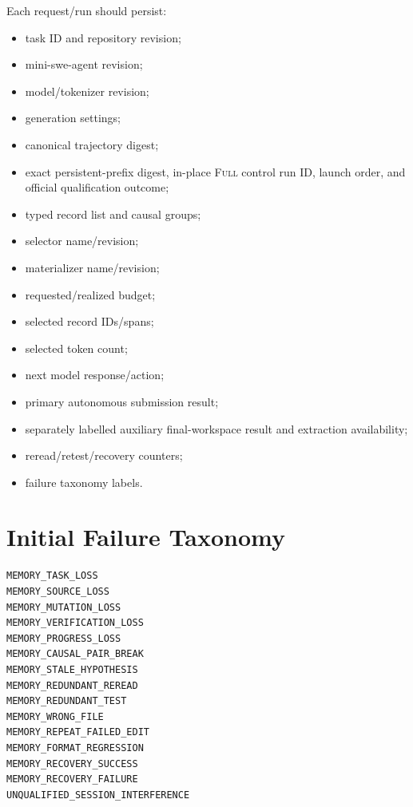\documentclass[11pt]{article}
\begin{document}
Each request/run should persist:
\begin{itemize}[leftmargin=*]
    \item task ID and repository revision;
    \item mini-swe-agent revision;
    \item model/tokenizer revision;
    \item generation settings;
    \item canonical trajectory digest;
    \item exact persistent-prefix digest, in-place \textsc{Full} control run ID,
    launch order, and official qualification outcome;
    \item typed record list and causal groups;
    \item selector name/revision;
    \item materializer name/revision;
    \item requested/realized budget;
    \item selected record IDs/spans;
    \item selected token count;
    \item next model response/action;
    \item primary autonomous submission result;
    \item separately labelled auxiliary final-workspace result and extraction
    availability;
    \item reread/retest/recovery counters;
    \item failure taxonomy labels.
\end{itemize}

\section{Initial Failure Taxonomy}

\begingroup
\small
\begin{verbatim}
MEMORY_TASK_LOSS
MEMORY_SOURCE_LOSS
MEMORY_MUTATION_LOSS
MEMORY_VERIFICATION_LOSS
MEMORY_PROGRESS_LOSS
MEMORY_CAUSAL_PAIR_BREAK
MEMORY_STALE_HYPOTHESIS
MEMORY_REDUNDANT_REREAD
MEMORY_REDUNDANT_TEST
MEMORY_WRONG_FILE
MEMORY_REPEAT_FAILED_EDIT
MEMORY_FORMAT_REGRESSION
MEMORY_RECOVERY_SUCCESS
MEMORY_RECOVERY_FAILURE
UNQUALIFIED_SESSION_INTERFERENCE
\end{verbatim}
\endgroup
\fi


% 
\end{document}
